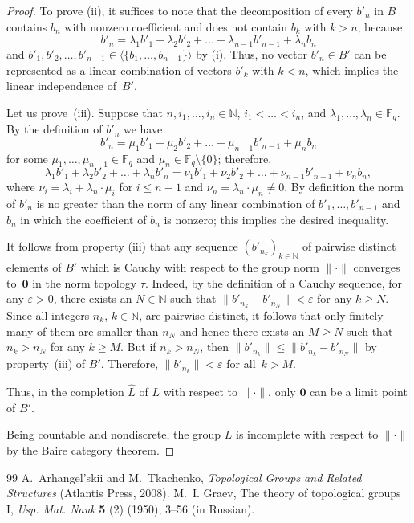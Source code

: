 \documentclass[10pt,a4paper]{amsart}
\theoremstyle{plain}
\theoremstyle{definition}
\theoremstyle{remark}
\begin{document}
\begin{proof}
To prove (ii), it suffices to note that the decomposition of every $b'_n$ in $B$  
contains $b_n$ with nonzero coefficient and does not contain $b_k$ with $k>n$, because 
$$
b'_n=\lambda_1 b'_1+ \lambda_2b'_2+ \dots +\lambda_{n-1}b'_{n-1}+\lambda_n b_n
$$ 
and 
$b'_1, b'_2, \dots, b'_{n-1}\in \langle \{b_1, \dots, b_{n-1}\}\rangle$ by (i). Thus, no vector $b'_n\in B'$ 
can be represented as a linear combination of vectors $b'_k$ with $k<n$, which implies the  
linear independence of~$B'$.

Let us prove~(iii). Suppose that $n, i_1,\dots, i_n\in \mathbb N$, $i_1<\dots <i_n$, and 
$\lambda_1,\dots,\lambda_n\in \mathbb F_q$. By the definition of $b'_n$ we have 
$$
b'_n=\mu_1 b'_1+ \mu_2b'_2+ \dots +\mu_{n-1}b'_{n-1}+\mu_n b_n 
$$
for some $\mu_1, \dots, \mu_{n-1}\in \mathbb F_q$ and $\mu_n\in \mathbb F_q\setminus \{0\}$; therefore, 
$$
\lambda_1 b'_1+ \lambda_2b'_2+ \dots +\lambda_n b'_n = 
\nu_1 b'_1+\nu_2 b'_2 + \dots + \nu_{n-1} b'_{n-1}+ \nu_n b_n,
$$
where $\nu_i = \lambda_i + \lambda_n\cdot \mu_i$ for $i\le n-1$ and $\nu_n=\lambda_n\cdot \mu_n\ne 0$. 
 By definition the norm of $b'_n$ is no greater than the norm of any linear combination of 
$b'_1, \dots, b'_{n-1}$ and $b_n$ in which the coefficient of $b_n$ is nonzero; this 
implies the desired inequality.  

\smallskip

It follows from property (iii) that any sequence $(b'_{n_k})_{k\in \mathbb N}$ of pairwise distinct elements 
of $B'$ which is Cauchy with 
respect to the group norm $\lVert\boldsymbol\cdot\rVert$ converges to~$\mathbf 0$ in the norm topology $\tau$. 
Indeed, by the definition of a 
Cauchy sequence, for any $\varepsilon >0$, there exists an $N\in \mathbb N$ such that 
$\|b'_{n_{k}}-b'_{n_N}\|< \varepsilon$ for any $k\ge N$. Since all integers $n_k$, $k\in \mathbb N$, 
are pairwise distinct, it follows that only finitely many of them are smaller than $n_N$ and hence there exists 
an $M\ge N$ such that $n_k>n_N$ for any $k\ge M$. 
But if $n_k > n_N$, then 
$\|b'_{n_k}\|\le \|b'_{n_k}-b'_{n_N}\|$ by property~(iii) of $B'$. Therefore, 
$\|b'_{n_k}\|<\varepsilon$ for all~$k > M$. 

Thus, in the completion $\widehat L$ of $L$ with respect to $\lVert\boldsymbol\cdot\rVert$, only $\mathbf 0$ 
can be a limit point of $B'$. 

Being countable and nondiscrete, the group $L$ is incomplete with respect to $\lVert\boldsymbol\cdot\rVert$ by 
the Baire category theorem. 
\end{proof}

\begin{thebibliography}{99}
 A.~Arhangel'skii and M.~Tkachenko, \emph{Topological Groups and Related Structures} (Atlantis Press, 2008).
 M.~I. Graev, The theory of topological groups I, \emph{Usp. Mat. Nauk} \textbf{5} (2) (1950), 3--56 (in Russian).
\end{thebibliography}
\end{document}
